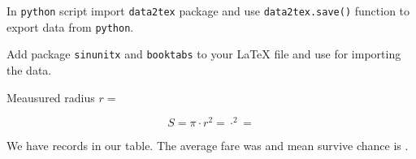 \documentclass[preview]{standalone}
\begin{document}
In \texttt{python} script import \texttt{data2tex} package and
use \verb+data2tex.save()+ function to export data from \texttt{python}.

Add package \texttt{sinunitx}  and \texttt{booktabs} to your \LaTeX{} file
and use \verb++ for importing the data.

Meausured radius $r = $

\[
S = \pi \cdot r^2 =  \cdot ^2 = 
\]





We have  records in our table. The average fare was  and mean survive chance is .
\end{document}
